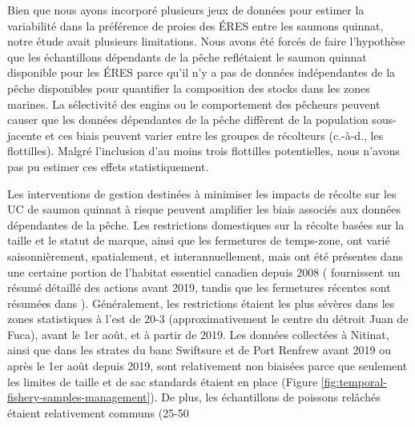 Bien que nous ayons incorporé plusieurs jeux de données pour estimer la variabilité dans la préférence de proies des ÉRES entre les saumons quinnat, notre étude avait plusieurs limitations. Nous avons été forcés de faire l'hypothèse que les échantillons dépendants de la pêche reflétaient le saumon quinnat disponible pour les ÉRES parce qu'il n'y a pas de données indépendantes de la pêche disponibles pour quantifier la composition des stocks dans les zones marines. La sélectivité des engins ou le comportement des pêcheurs peuvent causer que les données dépendantes de la pêche diffèrent de la population sous-jacente et ces biais peuvent varier entre les groupes de récolteurs (c.-à-d., les flottilles). Malgré l'inclusion d'au moins trois flottilles potentielles, nous n'avons pas pu estimer ces effets statistiquement.

Les interventions de gestion destinées à minimiser les impacts de récolte sur les UC de saumon quinnat à risque peuvent amplifier les biais associés aux données dépendantes de la pêche. Les restrictions domestiques sur la récolte basées sur la taille et le statut de marque, ainsi que les fermetures de temps-zone, ont varié saisonnièrement, spatialement, et interannuellement, mais ont été présentes dans une certaine portion de l'habitat essentiel canadien depuis 2008 (\citealt{dobsonTechnicalReviewManagement2020} fournissent un résumé détaillé des actions avant 2019, tandis que les fermetures récentes sont résumées dans \citealt{dfoPacificRegionFinal2023}). Généralement, les restrictions étaient les plus sévères dans les zones statistiques à l'est de 20-3 (approximativement le centre du détroit Juan de Fuca), avant le 1er août, et à partir de 2019. Les données collectées à Nitinat, ainsi que dans les strates du banc Swiftsure et de Port Renfrew avant 2019 ou après le 1er août depuis 2019, sont relativement non biaisées parce que seulement les limites de taille et de sac standards étaient en place (Figure \ref{fig:temporal-fishery-samples-management}). De plus, les échantillons de poissons relâchés étaient relativement communs (25-50 %

